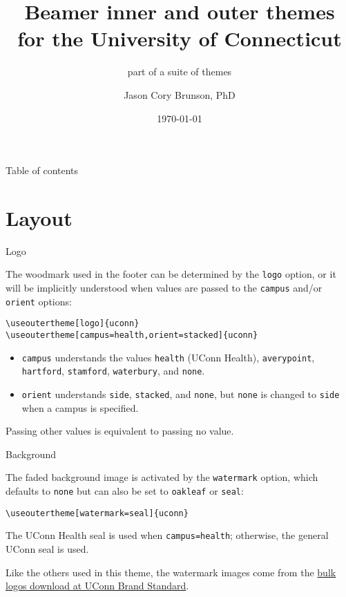 \documentclass{beamer}
\title[Beamer inner and outer themes for UConn]{Beamer inner and outer themes\\ for the University of Connecticut}
\subtitle{part of a suite of themes}
\author[Cory Brunson]{Jason Cory Brunson, PhD}
\institute[UConn Health]{Center for Quantitative Medicine\\ University of Connecticut School of Medicine}
\date{\today}
\begin{document}
\begin{frame}
\titlepage
\end{frame}


\begin{frame}{Table of contents}
\tableofcontents
\end{frame}


\section{Layout}


\begin{frame}[fragile]{Logo}

The woodmark used in the footer can be determined by the \verb|logo| option, or it will be implicitly understood when values are passed to the \verb|campus| and/or \verb|orient| options:

\begin{verbatim}
\useoutertheme[logo]{uconn}
\useoutertheme[campus=health,orient=stacked]{uconn}
\end{verbatim}

\begin{itemize}
\item \verb|campus| understands the values \verb|health| (UConn Health), \verb|averypoint|, \verb|hartford|, \verb|stamford|, \verb|waterbury|, and \verb|none|.
\item \verb|orient| understands \verb|side|, \verb|stacked|, and \verb|none|, but \verb|none| is changed to \verb|side| when a campus is specified.
\end{itemize}
Passing other values is equivalent to passing no value.

\end{frame}


\begin{frame}[fragile]{Background}

The faded background image is activated by the \verb|watermark| option, which defaults to \verb|none| but can also be set to \verb|oakleaf| or \verb|seal|:

\begin{verbatim}
\useoutertheme[watermark=seal]{uconn}
\end{verbatim}

The UConn Health seal is used when \verb|campus=health|; otherwise, the general UConn seal is used.

Like the others used in this theme, the watermark images come from the \href{https://brand.uconn.edu/downloads/logos/}{bulk logos download at UConn Brand Standard}.

\end{frame}
\end{document}
